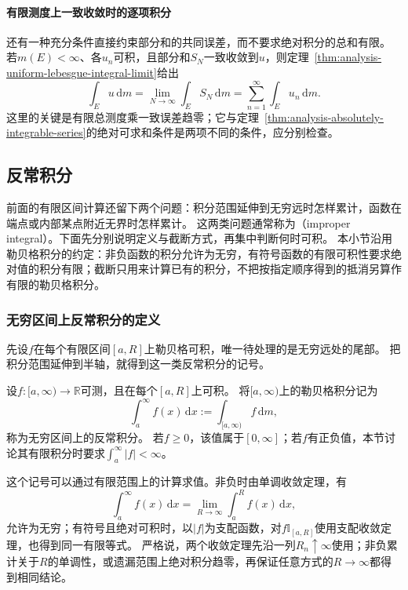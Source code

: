 \paragraph{有限测度上一致收敛时的逐项积分}
还有一种充分条件直接约束部分和的共同误差，而不要求绝对积分的总和有限。
若$m(E)<\infty$、各$u_n$可积，且部分和$S_N$一致收敛到$u$，则定理~\ref{thm:analysis-uniform-lebesgue-integral-limit}给出
\[
 \int_Eu\,\mathrm dm
 =\lim_{N\to\infty}\int_ES_N\,\mathrm dm
 =\sum_{n=1}^{\infty}\int_Eu_n\,\mathrm dm.
\]
这里的关键是有限总测度乘一致误差趋零；它与定理~\ref{thm:analysis-absolutely-integrable-series}的绝对可求和条件是两项不同的条件，应分别检查。

\subsection{反常积分}
\label{sec:analysis-improper-integrals}

前面的有限区间计算还留下两个问题：积分范围延伸到无穷远时怎样累计，函数在端点或内部某点附近无界时怎样累计。
这两类问题通常称为（improper integral）。下面先分别说明定义与截断方式，再集中判断何时可积。
本小节沿用勒贝格积分的约定：非负函数的积分允许为无穷，有符号函数的有限可积性要求绝对值的积分有限；截断只用来计算已有的积分，不把按指定顺序得到的抵消另算作有限的勒贝格积分。

\subsubsection{无穷区间上反常积分的定义}

先设$f$在每个有限区间$[a,R]$上勒贝格可积，唯一待处理的是无穷远处的尾部。
把积分范围延伸到半轴，就得到这一类反常积分的记号。
\begin{definition}[无穷区间上的反常积分]
\label{def:analysis-improper-infinite-interval}
设$f:[a,\infty)\to\mathbb R$可测，且在每个$[a,R]$上可积。
将$[a,\infty)$上的勒贝格积分记为
\[
 \int_a^\infty f(x)\,\mathrm dx:=\int_{[a,\infty)}f\,\mathrm dm,
\]
称为无穷区间上的反常积分。
若$f\geq0$，该值属于$[0,\infty]$；若$f$有正负值，本节讨论其有限积分时要求$\int_a^\infty|f|<\infty$。
\end{definition}
这个记号可以通过有限范围上的计算求值。非负时由单调收敛定理，有
\[
 \int_a^\infty f(x)\,\mathrm dx
 =\lim_{R\to\infty}\int_a^R f(x)\,\mathrm dx,
\]
允许为无穷；有符号且绝对可积时，以$|f|$为支配函数，对$f\mathbb I_{[a,R]}$使用支配收敛定理，也得到同一有限等式。
严格说，两个收敛定理先沿一列$R_n\uparrow\infty$使用；非负累计关于$R$的单调性，或遗漏范围上绝对积分趋零，再保证任意方式的$R\to\infty$都得到相同结论。


